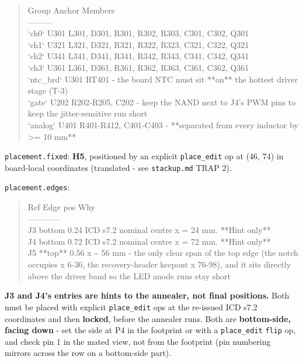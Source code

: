 \documentclass[11pt,a4paper]{article}
\begin{document}
\begin{quote}\small\ttfamily\raggedright
\textbar{} Group \textbar{} Anchor \textbar{} Members \textbar{}\\
\textbar{}---\textbar{}---\textbar{}---\textbar{}\\
\textbar{} `ch0` \textbar{} U301 \textbar{} L301, D301, R301, R302, R303, C301, C302, Q301 \textbar{}\\
\textbar{} `ch1` \textbar{} U321 \textbar{} L321, D321, R321, R322, R323, C321, C322, Q321 \textbar{}\\
\textbar{} `ch2` \textbar{} U341 \textbar{} L341, D341, R341, R342, R343, C341, C342, Q341 \textbar{}\\
\textbar{} `ch3` \textbar{} U361 \textbar{} L361, D361, R361, R362, R363, C361, C362, Q361 \textbar{}\\
\textbar{} `ntc\_brd` \textbar{} U301 \textbar{} RT401 - the board NTC must sit {*}{*}on{*}{*} the hottest driver stage (T-3) \textbar{}\\
\textbar{} `gate` \textbar{} U202 \textbar{} R202-R205, C202 - keep the NAND next to J4's PWM pins to keep the jitter-sensitive run short \textbar{}\\
\textbar{} `analog` \textbar{} U401 \textbar{} R401-R412, C401-C403 - {*}{*}separated from every inductor by \textgreater{}= 10 mm{*}{*} \textbar{}
\end{quote}
\texttt{placement.fixed}: \textbf{H5}, positioned by an explicit \texttt{place\_edit} op at (46, 74) in board-local coordinates (translated - see \texttt{stackup.md} TRAP 2).

\texttt{placement.edges}:

\begin{quote}\small\ttfamily\raggedright
\textbar{} Ref \textbar{} Edge \textbar{} pos \textbar{} Why \textbar{}\\
\textbar{}---\textbar{}---\textbar{}---\textbar{}---\textbar{}\\
\textbar{} J3 \textbar{} bottom \textbar{} 0.24 \textbar{} ICD s7.2 nominal centre x = 24 mm. {*}{*}Hint only{*}{*} \textbar{}\\
\textbar{} J4 \textbar{} bottom \textbar{} 0.72 \textbar{} ICD s7.2 nominal centre x = 72 mm. {*}{*}Hint only{*}{*} \textbar{}\\
\textbar{} J5 \textbar{} {*}{*}top{*}{*} \textbar{} 0.56 \textbar{} x \textasciitilde{} 56 mm - the only clear span of the top edge (the notch occupies x 6-36, the recovery-header keepout x 76-98), and it sits directly above the driver band so the LED anode runs stay short \textbar{}
\end{quote}
\textbf{J3 and J4's entries are hints to the annealer, not final positions.} Both must be placed with explicit \texttt{place\_edit} ops at the re-issued ICD s7.2 coordinates and then \textbf{locked}, before the annealer runs. Both are \textbf{bottom-side, facing down} - set the side at P4 in the footprint or with a \texttt{place\_edit} \texttt{flip} op, and check pin 1 in the mated view, not from the footprint (pin numbering mirrors across the row on a bottom-side part).
\end{document}
